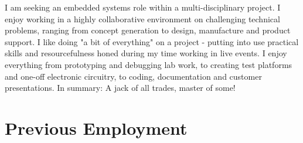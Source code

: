 \documentclass[]{deedy-resume-openfont-wjl}
\begin{document}
%
%


%
%
\vspace{-\topsep} %
\begin{center}
  \vspace{-\topsep} %
  \huge\color{subheadings}
\end{center}
I am seeking an embedded systems role within a multi-disciplinary project.
I enjoy working in a highly collaborative environment on challenging technical problems, ranging from concept generation to design, manufacture and product support.
I like doing "a bit of everything" on a project - putting into use practical skills and resourcefulness honed during my time working in live events.
I enjoy everything from prototyping and debugging lab work, to creating test platforms and one-off electronic circuitry, to coding, documentation and customer presentations.
\newline
In summary: A jack of all trades, master of some!

%
%
\sectionsep
\section{Previous Employment}












\end{document}
